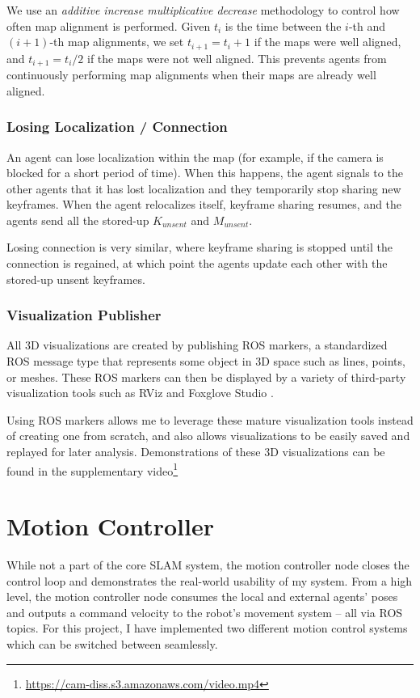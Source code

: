 We use an \textit{additive increase multiplicative decrease} methodology to control how often map alignment is performed. Given $t_i$ is the time between the $i$-th and $(i+1)$-th map alignments, we set $t_{i+1} = t_i + 1$ if the maps were well aligned, and $t_{i+1} = t_i / 2$ if the maps were not well aligned. This prevents agents from continuously performing map alignments when their maps are already well aligned.

\subsubsection{Losing Localization / Connection}
\label{sec:losing-localization-or-connection}
An agent can lose localization within the map (for example, if the camera is blocked for a short period of time). When this happens, the agent signals to the other agents that it has lost localization and they temporarily stop sharing new keyframes. When the agent relocalizes itself, keyframe sharing resumes, and the agents send all the stored-up $K_{unsent}$ and $M_{unsent}$.

Losing connection is very similar, where keyframe sharing is stopped until the connection is regained, at which point the agents update each other with the stored-up unsent keyframes.

\subsubsection{Visualization Publisher}
\label{sec:visualization-publisher}
All 3D visualizations are created by publishing ROS markers, a standardized ROS message type that represents some object in 3D space such as lines, points, or meshes. These ROS markers can then be displayed by a variety of third-party visualization tools such as RViz \autocite{10.1007/s11235-015-0034-5} and Foxglove Studio \autocite{foxgloveStudio}.

Using ROS markers allows me to leverage these mature visualization tools instead of creating one from scratch, and also allows visualizations to be easily saved and replayed for later analysis. Demonstrations of these 3D visualizations can be found in the supplementary video\footnote[1]{\url{https://cam-diss.s3.amazonaws.com/video.mp4}}

\section{Motion Controller}
\label{sec:motion-controller}
While not a part of the core SLAM system, the motion controller node closes the control loop and demonstrates the real-world usability of my system. From a high level, the motion controller node consumes the local and external agents' poses and outputs a command velocity to the robot's movement system – all via ROS topics. For this project, I have implemented two different motion control systems which can be switched between seamlessly.

